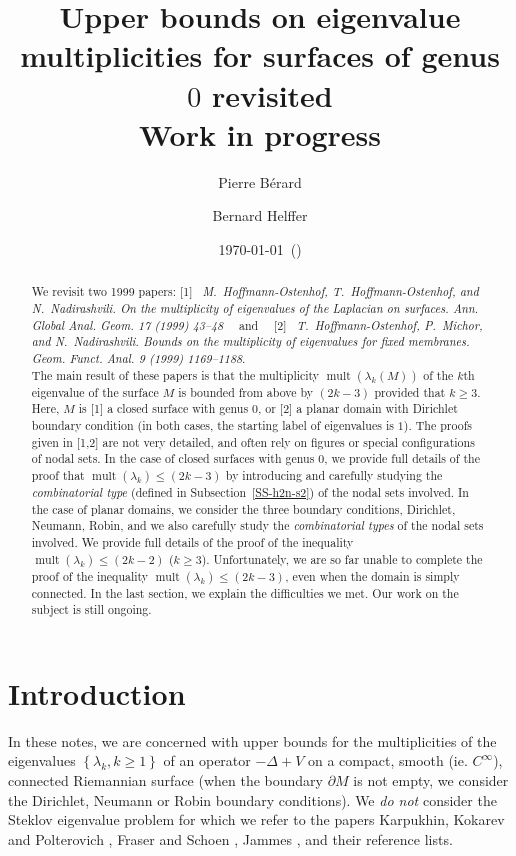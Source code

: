\documentclass[12pt,a4paper]{amsart}
\title[Eigenvalue multiplicites]{Upper bounds on eigenvalue multiplicities
 for surfaces of genus $0$ revisited\\[5pt]Work in progress}
\author[P. B\'{e}rard]{Pierre B\'erard}
\author[B. Helffer]{Bernard Helffer}
\date{\today~(\currfilename)}
\theoremstyle{plain} %
\theoremstyle{definition}
\numberwithin{equation}{section}
\numberwithin{figure}{section}
\numberwithin{table}{section}
\DeclareMathOperator{\mult}{mult}
\newcommand{\set}[1]{\left\lbrace #1 \right\rbrace}
\begin{document}
\begin{abstract}
We revisit two 1999 papers: [1]~ \emph{M.~Hoffmann-Ostenhof, T.~Hoffmann-Ostenhof, and N.~Nadirashvili. On the multiplicity of eigenvalues of the Laplacian on surfaces. Ann. Global Anal. Geom. 17 (1999) 43--48} ~~and~~ [2]~ \emph{T.~Hoffmann-Ostenhof, P.~Michor, and N.~Nadirashvili. Bounds on the multiplicity of eigenvalues for fixed membranes. Geom. Funct. Anal. 9 (1999) 1169--1188}.\\
The main result of these papers is that the multiplicity $\mult(\lambda_k(M))$ of the $k$th eigenvalue of the surface $M$ is bounded from above by $(2k-3)$ provided that $k \ge 3$. Here, $M$ is [1] a closed surface with genus $0$, or [2] a planar domain with Dirichlet boundary condition (in both cases, the starting label of eigenvalues is $1$). The proofs given in [1,2] are not very detailed, and often rely on figures or special configurations of nodal sets. In the case of closed surfaces with genus $0$, we provide full details of the proof that $\mult(\lambda_k) \le (2k-3)$ by  introducing and carefully studying the \emph{combinatorial type} (defined in Subsection~\ref{SS-h2n-s2}) of the nodal sets involved.  In the case of planar domains, we consider the three boundary conditions, Dirichlet, Neumann, Robin, and we also carefully study the \emph{combinatorial types} of the nodal sets involved. We provide full details of the proof of the inequality $\mult(\lambda_k) \le (2k-2)$ ($k \ge 3$). Unfortunately, we are so far unable to complete the proof of the inequality $\mult(\lambda_k) \le (2k-3)$, even when the domain is simply connected. In the last section, we explain the difficulties we met. Our work on the subject is still ongoing.
\end{abstract}

\maketitle
\tableofcontents

\vspace{2cm}


\section{Introduction}\label{S-intro}
 In these notes, we are concerned with upper bounds for the multiplicities of the eigenvalues $\set{\lambda_k, k\ge 1}$ of an operator $-\Delta + V$ on a compact, smooth (ie. $C^{\infty}$), connected Riemannian surface (when the boundary $\partial M$ is not empty, we consider the Dirichlet, Neumann or Robin boundary conditions).  We \emph{do not} consider the Steklov eigenvalue problem for which we refer to the papers Karpukhin, Kokarev and Polterovich \cite{KaKP2014},
Fraser and Schoen \cite{FrSc2016}, Jammes \cite{Jam2016}, and their
reference lists. \medskip
\end{document}
